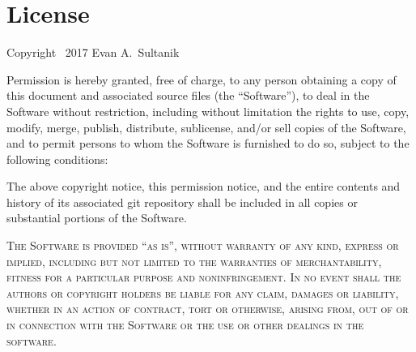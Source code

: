 \documentclass{article}
\begin{document}
\section{License}

Copyright \textcopyright\ 2017 Evan A.~Sultanik

Permission is hereby granted, free of charge, to any person obtaining a copy
of this document and associated source files (the ``Software''), to deal
in the Software without restriction, including without limitation the rights
to use, copy, modify, merge, publish, distribute, sublicense, and/or sell
copies of the Software, and to permit persons to whom the Software is
furnished to do so, subject to the following conditions:

The above copyright notice, this permission notice, and the entire
contents and history of its associated git repository shall be
included in all copies or substantial portions of the Software.

\textsc{The Software is provided ``as is'', without warranty of any kind, express or implied, including but not limited to the warranties of merchantability, fitness for a particular purpose and noninfringement. In no event shall the authors or copyright holders be liable for any claim, damages or liability, whether in an action of contract, tort or otherwise, arising from, out of or in connection with the Software or the use or other dealings in the software.}
\end{document}
